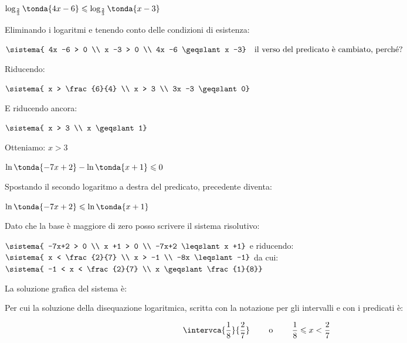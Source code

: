 \begin{esempio}
 \(\log_{\frac{2}{3}} \tonda{4x -6} \leqslant \log_{\frac{2}{3}} \tonda{x -3}\)

Eliminando i logaritmi e tenendo conto delle condizioni di esistenza:

\(\sistema{
4x -6 > 0 \\
x -3 > 0 \\
4x -6 \geqslant x -3} \quad \text{il verso del predicato è cambiato, perché?}\) 

Riducendo:

\(\sistema{
x > \frac{6}{4} \\
x > 3 \\
3x -3 \geqslant 0}\)

E riducendo ancora:

\(\sistema{
x > 3 \\
x \geqslant 1}\)

Otteniamo: \quad \(x > 3\)

\end{esempio}

\begin{esempio}
\(\ln \tonda{-7x+2} - \ln \tonda{x +1} \leqslant 0\)
 
Spostando il secondo logaritmo a destra del predicato, precedente diventa:

\(\ln \tonda{-7x+2} \leqslant \ln \tonda{x +1}\)

Dato che la base è maggiore di zero posso scrivere il sistema risolutivo:

\(\sistema{
-7x+2 > 0 \\
x +1 > 0 \\
-7x+2 \leqslant x +1}\)
\quad e riducendo: \quad 
\(\sistema{
x < \frac{2}{7} \\
x > -1 \\
-8x \leqslant -1}\)
\quad da cui: \quad
\(\sistema{
-1 < x < \frac{2}{7} \\
x \geqslant \frac{1}{8}}\)

\vspace{12pt}
\noindent
La soluzione grafica del sistema è:

\noindent
\begin{inaccessibleblock}
  \dissistemaa
\end{inaccessibleblock}

\noindent
Per cui la soluzione della disequazione logaritmica, scritta con la notazione 
per gli intervalli e con i predicati è:

\[\intervca{\frac{1}{8}}{\frac{2}{7}} \qquad \text{ o } \qquad 
  \frac{1}{8} \leqslant x < \frac{2}{7}\]

\end{esempio}

